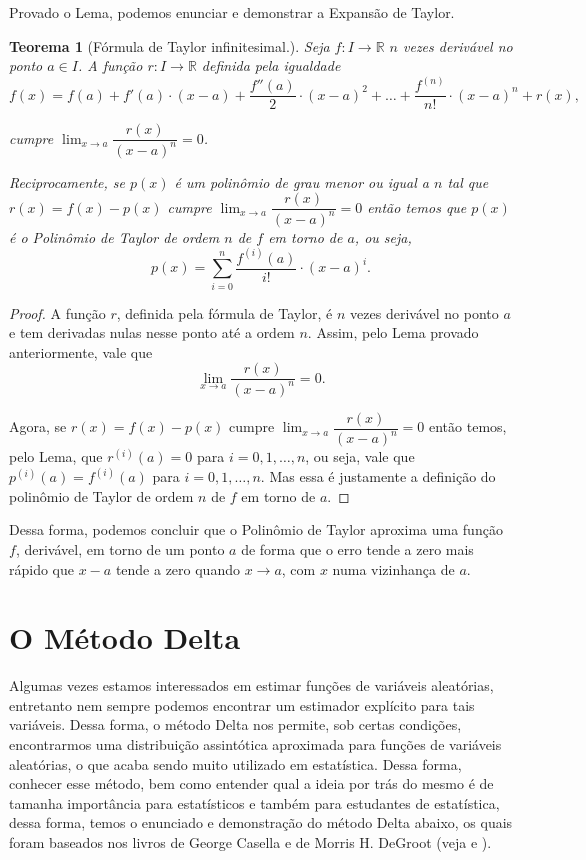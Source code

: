 \documentclass{article}
\newtheorem{theorem}{Teorema}
\begin{document}
Provado o Lema, podemos enunciar e demonstrar a Expansão de Taylor.

\begin{theorem}[Fórmula de Taylor infinitesimal.]
    Seja $f : I\to \mathbb{R}$ $n$ vezes derivável no ponto $a\in I$. A função $r : I \to \mathbb{R}$ definida pela igualdade
    \[f(x) = f(a) + f'(a)\cdot (x - a) + \dfrac{f''(a)}{2}\cdot (x - a)^2 + \dots + \dfrac{f^{(n)}}{n!}\cdot (x - a)^n + r(x),\]
    
    cumpre $\lim_{x\to a} \dfrac{r(x)}{(x - a)^n} = 0$.
    
    \noindent Reciprocamente, se $p(x)$ é um polinômio de grau menor ou igual a $n$ tal que $r(x) = f(x) - p(x)$ cumpre $\lim_{x\to a} \dfrac{r(x)}{(x - a)^n} = 0$ então temos que $p(x)$ é o Polinômio de Taylor de ordem $n$ de $f$ em torno de $a$, ou seja,
    \[p(x) = \sum_{i = 0}^{n} \dfrac{f^{(i)}(a)}{i!}\cdot (x - a)^i.\]
\end{theorem}

\begin{proof}
    A função $r$, definida pela fórmula de Taylor, é $n$ vezes derivável no ponto $a$ e tem derivadas nulas nesse ponto até a ordem $n$. Assim, pelo Lema provado anteriormente, vale que
    \[\lim_{x\to a} \dfrac{r(x)}{(x - a)^n} = 0.\]
    
    Agora, se $r(x) = f(x) - p(x)$ cumpre $\lim_{x\to a} \dfrac{r(x)}{(x - a)^n} = 0$ então temos, pelo Lema, que $r^{(i)}(a) = 0$ para $i = 0, 1, \dots, n$, ou seja, vale que $p^{(i)}(a) = f^{(i)}(a)$ para $i = 0, 1, \dots, n$. Mas essa é justamente a definição do polinômio de Taylor de ordem $n$ de $f$ em torno de $a$.
\end{proof}

Dessa forma, podemos concluir que o Polinômio de Taylor aproxima uma função $f$, derivável, em torno de um ponto $a$ de forma que o erro tende a zero mais rápido que $x - a$ tende a zero quando $x\to a$, com $x$ numa vizinhança de $a$.

\section*{O Método Delta}

Algumas vezes estamos interessados em estimar funções de variáveis aleatórias, entretanto nem sempre podemos encontrar um estimador explícito para tais variáveis. Dessa forma, o método Delta nos permite, sob certas condições, encontrarmos uma distribuição assintótica aproximada para funções de variáveis aleatórias, o que acaba sendo muito utilizado em estatística. Dessa forma, conhecer esse método, bem como entender qual a ideia por trás do mesmo é de tamanha importância para estatísticos e também para estudantes de estatística, dessa forma, temos o enunciado e demonstração do método Delta abaixo, os quais foram baseados nos livros de George Casella e de Morris H. DeGroot (veja \cite{casella} e \cite{degroot}).
\end{document}
